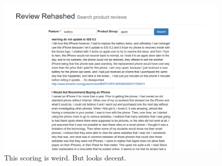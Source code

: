 \documentclass{article}
\begin{document}
\begin{description}
\begin{figure}[ht!]
  \centering
  \includegraphics[width=1\textwidth]{a_new_scoring}
  \caption{This scoring is weird.  But looks decent.~\label{fig:Search_Engine}}
\end{figure}

\end{description}
\end{document}
